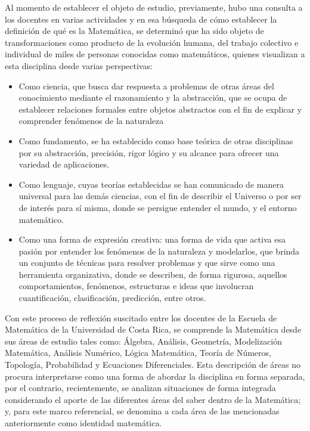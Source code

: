 Al momento de establecer el objeto de estudio, previamente, hubo una consulta a los docentes en varias actividades y en esa búsqueda de cómo establecer la definición de qué es la Matemática, se determinó que ha sido objeto de transformaciones como producto de la evolución humana, del trabajo colectivo e individual de miles de personas conocidas como matemáticos, quienes visualizan a esta disciplina desde varias perspectivas: 

\begin{itemize}
    
     \color{blue} \item \color{black} Como ciencia, que busca dar respuesta a problemas de otras áreas del conocimiento mediante el razonamiento y la abstracción, que se ocupa de establecer relaciones formales entre objetos abstractos con el fin de explicar y comprender fenómenos de la naturaleza
    
    \color{blue} \item \color{black} Como fundamento, se ha establecido como base teórica de otras disciplinas por su abstracción, precisión, rigor lógico y su alcance para ofrecer una variedad de aplicaciones.
    
    \color{blue} \item \color{black} Como lenguaje, cuyas teorías establecidas se han comunicado de manera universal para las demás ciencias, con el fin de describir el Universo o por ser de interés para sí misma, donde se persigue entender el mundo, y el entorno matemático. 
    
    \color{blue} \item \color{black} Como una forma de expresión creativa: una forma de vida que activa esa pasión por entender los fenómenos de la naturaleza y modelarlos, que brinda un conjunto de técnicas para resolver problemas y que sirve como una herramienta organizativa, donde se describen, de forma rigurosa, aquellos comportamientos, fenómenos, estructuras e ideas que involucran cuantificación, clasificación, predicción, entre otros. 
    \end{itemize}

Con este proceso de reflexión suscitado entre los docentes de la Escuela de Matemática de la Universidad de Costa Rica, se comprende la Matemática desde sus áreas de estudio tales como: Álgebra, Análisis, Geometría, Modelización Matemática, Análisis Numérico, Lógica Matemática, Teoría de Números, Topología, Probabilidad y Ecuaciones Diferenciales.   Esta descripción de áreas no procura interpretarse como una forma de abordar la disciplina en forma separada, por el contrario, recientemente, se analizan situaciones de forma integrada considerando el aporte de las diferentes áreas del saber dentro de la Matemática; y, para este marco referencial, se denomina a cada área de las mencionadas anteriormente como identidad matemática.

